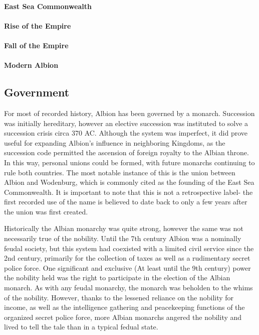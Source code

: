 	\paragraph{East Sea Commonwealth} 

	\paragraph{Rise of the Empire}

	\paragraph{Fall of the Empire}

	\paragraph{Modern Albion} %


\subsection{Government} 
	
	For most of recorded history, Albion has been governed by a monarch.  Succession was initially hereditary, however an elective succession was instituted to solve a succession crisis circa 370 AC.  Although the system was imperfect, it did prove useful for expanding Albion's influence in neighboring Kingdoms, as the succession code permitted the ascension of foreign royalty to the Albian throne.  In this way, personal unions could be formed, with future monarchs continuing to rule both countries.  The most notable instance of this is the union between Albion and Wodenburg, which is commonly cited as the founding of the East Sea Commonwealth.  It is important to note that this is not a retrospective label- the first recorded use of the name is believed to date back to only a few years after the union was first created.
	
	Historically the Albian monarchy was quite strong, however the same was not necessarily true of the nobility.  Until the 7th century Albion was a nominally feudal society, but this system had  coexisted with a limited civil service since the 2nd century, primarily for the collection of taxes as well as a rudimentary secret police force.  One significant and exclusive (At least until the 9th century) power the nobility held was the right to participate in the election of the Albian monarch.  As with any feudal monarchy, the monarch was beholden to the whims of the nobility.  However, thanks to the lessened reliance on the nobility for income, as well as the intelligence gathering and peacekeeping functions of the organized secret police force, more Albian monarchs angered the nobility and lived to tell the tale than in a typical fedual state.

